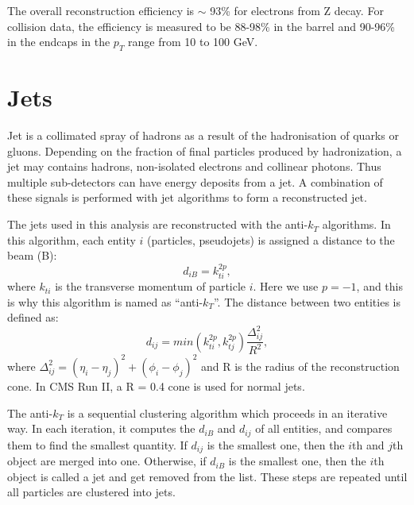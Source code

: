 \documentclass[thesis.tex]{subfiles}
\begin{document}
The overall reconstruction efficiency is $\sim$ 93\% for electrons from Z decay.
For collision data, the efficiency is measured to be 88-98\% in the barrel and 90-96\% in the endcaps in the $p_T$ range from 10 to 100 GeV.

\section{Jets}
Jet is a collimated spray of hadrons as a result of the hadronisation of quarks or gluons. 
Depending on the fraction of final particles produced by hadronization, a jet may contains hadrons, non-isolated electrons and collinear photons. 
Thus multiple sub-detectors can have energy deposits from a jet.
A combination of these signals is performed with jet algorithms to form a reconstructed jet. 

The jets used in this analysis are reconstructed with the anti-$k_T$ algorithms. 
In this algorithm, each entity $i$ (particles, pseudojets) is assigned a distance to the beam (B): 
\begin{equation}
	d_{iB} = k_{ti}^{2p},
\end{equation}
where $k_{ti}$ is the transverse momentum of particle $i$. Here we use $p = -1$, and this is why this algorithm is named as ``anti-$k_T$''. 
The distance between two entities is defined as:
\begin{equation}
	d_{ij} = min(k_{ti}^{2p}, k_{tj}^{2p})\frac{\Delta_{ij}^2}{R^2},
\end{equation}
where $\Delta_{ij}^2 = (\eta_i - \eta_j)^2 + (\phi_i - \phi_j)^2$ and R is the radius of the reconstruction cone. 
In CMS Run II, a R = 0.4 cone is used for normal jets. 

The anti-$k_T$ is a sequential clustering algorithm which proceeds in an iterative way.
In each iteration, it computes the $d_{iB}$ and $d_{ij}$ of all entities, and compares them to find the smallest quantity.  
If $d_{ij}$ is the smallest one, then the $i$th and $j$th object are merged into one. 
Otherwise, if $d_{iB}$ is the smallest one, then the $i$th object is called a jet and get removed from the list. 
These steps are repeated until all particles are clustered into jets. 
\end{document}
